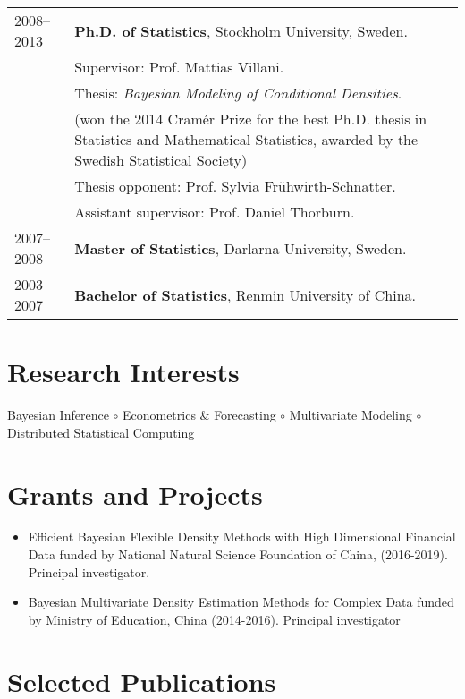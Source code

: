 \documentclass[twoside,a4paper,10pt]{amsart}
\begin{document}
\begin{tabular}{ l  p{} l}
  2008--2013 & \textbf{Ph.D. of Statistics}, Stockholm University, Sweden. \\
             & Supervisor: Prof. Mattias Villani.                          \\

             & Thesis: \emph{Bayesian Modeling of Conditional Densities}. \\
             & (won the 2014 Cramér Prize for the best Ph.D. thesis in Statistics and Mathematical Statistics, awarded by the Swedish Statistical Society) \\
             & Thesis opponent: Prof. Sylvia Frühwirth-Schnatter.               \\
             & Assistant supervisor: Prof. Daniel Thorburn.                     \\
  2007--2008 & \textbf{Master of Statistics}, Darlarna
               University, Sweden.                                             \\

 2003--2007 & \textbf{Bachelor of Statistics}, Renmin University of China. \\
\end{tabular}

\section*{Research Interests}

Bayesian Inference $\circ$ Econometrics \& Forecasting $\circ$ Multivariate
Modeling $\circ$ Distributed Statistical Computing


\section*{Grants and Projects}
\begin{itemize}
\item Efficient Bayesian Flexible Density Methods with High Dimensional Financial Data
  funded by National Natural Science Foundation of China, (2016-2019). Principal investigator.

\item Bayesian Multivariate Density Estimation Methods for Complex Data funded by Ministry
  of Education, China (2014-2016). Principal investigator

\end{itemize}

\section*{Selected Publications}
\end{document}
